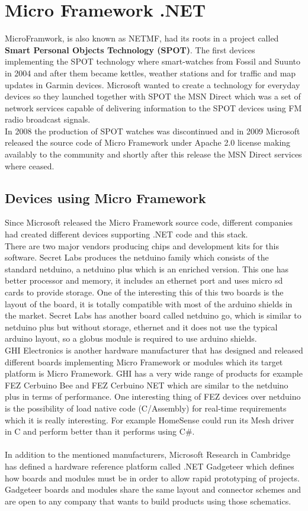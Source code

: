 \section{Micro Framework .NET}\label{S:SOTA-NETMF}
MicroFramwork, is also known as NETMF, had its roots in a project called \textbf{Smart Personal Objects Technology (SPOT)}. The first devices implementing the SPOT technology where smart-watches from Fossil and Suunto in 2004 and after them became kettles, weather stations and for traffic and map updates in Garmin devices. Microsoft wanted to create a technology for everyday devices so they launched together with SPOT the MSN Direct which was a set of network services capable of delivering information to the SPOT devices using FM radio broadcast signals.
\\
In 2008 the production of SPOT watches was discontinued and in 2009 Microsoft released the source code of Micro Framework under Apache 2.0 license making availably to the community and shortly after this release the MSN Direct services where ceased.

\subsection{Devices using Micro Framework}\label{SS:SOTA-MicroFramework-Devices}
Since Microsoft released the Micro Framework source code, different companies had created different devices supporting .NET code and this stack.
\\
There are two major vendors producing chips and development kits for this software. Secret Labs produces the netduino family which consists of the standard netduino, a netduino plus which is an enriched version. This one has better processor and memory, it includes an ethernet port and uses micro sd cards to provide storage. One of the interesting this of this two boards is the layout of the board, it is totally compatible with most of the arduino shields in the market.
Secret Labs has another board called netduino go, which is similar to netduino plus but without storage, ethernet and it does not use the typical arduino layout, so a globus module is required to use arduino shields.
\\
GHI Electronics is another hardware manufacturer that has designed and released different boards implementing Micro Framework or modules which its target platform is Micro Framework. GHI has a very wide range of products for example FEZ Cerbuino Bee and FEZ Cerbuino NET which are similar to the netduino plus in terms of performance. One interesting thing of FEZ devices over netduino is the possibility of load native code (C/Assembly) for real-time requirements which it is really interesting. For example HomeSense could run its Mesh driver in C and perform better than it performs using C\#.
\\
\\
In addition to the mentioned manufacturers, Microsoft Research in Cambridge has defined a hardware reference platform called .NET Gadgeteer which defines how boards and modules must be in order to allow rapid prototyping of projects. Gadgeteer boards and modules share the same layout and connector schemes and are open to any company that wants to build products using those schematics.

